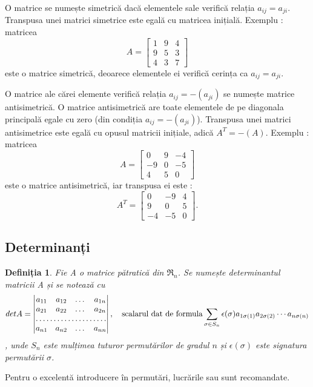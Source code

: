 O matrice se numește simetrică dacă elementele sale verifică relația $a_{ij} =
a_{ji}$. Transpusa unei matrici simetrice este egală cu matricea inițială.
Exemplu : matricea
\begin{equation*}
A = 
\begin{bmatrix}
1 & 9 & 4 \\
9 & 5 & 3 \\
4 & 3 & 7  
\end{bmatrix}
\end{equation*} este o matrice simetrică, deoarece elementele ei verifică
cerința ca $a_{ij} = a_{ji}$.
\indent
 
O matrice ale cărei elemente verifică relația $a_{ij} = -(a_{ji})$ se numește
matrice antisimetrică. O matrice antisimetrică are toate elementele de pe 
diagonala principală egale cu zero (din condiția $a_{ij} = -(a_{ji})$).
Transpusa unei matrici antisimetrice este egală cu opusul matricii inițiale,
adică $A^T = -(A)$.
Exemplu : matricea
\begin{equation*}
A = 
\begin{bmatrix}
0 & 9 & -4 \\
-9 & 0 & -5 \\
4 & 5 & 0
\end{bmatrix}
\end{equation*} este o matrice antisimetrică, iar transpusa ei este :
\begin{equation*}
A^T =
\begin{bmatrix}
0 & -9 & 4 \\
9 & 0 & 5 \\
-4 & -5 & 0
\end{bmatrix}.
\end{equation*}

\subsection{Determinanți}
\label{ch1:sec_matrix:sub_determinants}

\newtheorem{th_det}[th_matrixdef]{Definiția}
\begin{th_det}
Fie A o matrice pătratică din $\mathfrak{R}_{n}$. Se numește determinantul
matricii A și se notează cu 
\[
detA = 
\begin{vmatrix}
a_{11} & a_{12} & \dots & a_{1n} \\
a_{21} & a_{22} & \dots & a_{2n} \\
\hdotsfor{4} \\
a_{n1} & a_{n2} & \dots & a_{nn}
\end{vmatrix}, \quad \text{scalarul dat de formula}  
\sum_{\substack{\sigma \in S_{n}}} \epsilon (\sigma) a_{1\sigma(1)}
a_{2\sigma(2)} \cdots a_{n\sigma(n)}
\], unde $S_{n}$ este mulțimea tuturor permutărilor de gradul $\mathit{n}$ și
$\epsilon(\sigma)$ este signatura permutării $\sigma$.
\end{th_det}
Pentru o excelentă introducere în permutări, lucrările \cite{NitaNS96} sau
\cite{Rosculet87} sunt recomandate.

